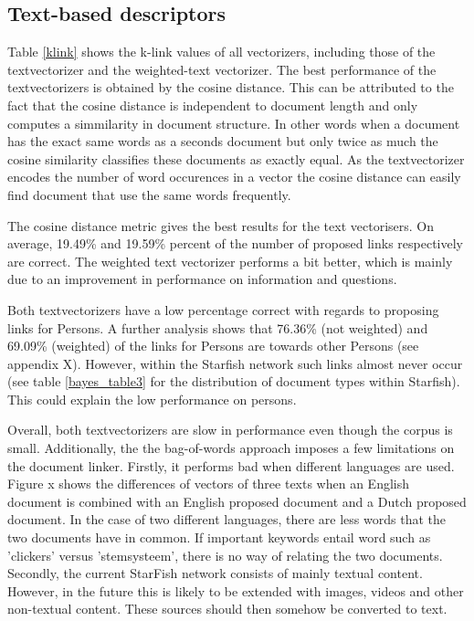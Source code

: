 \subsection{Text-based descriptors}
Table \ref{klink} shows the k-link values of all vectorizers, including those
of the textvectorizer and the weighted-text vectorizer. The best performance of
the textvectorizers is obtained by the cosine distance. This can be attributed
to the fact that the cosine distance is independent to document length and only
computes a simmilarity in document structure. In other words when a document
has the exact same words as a seconds document but only twice as much the
cosine similarity classifies these documents as exactly equal. As the textvectorizer
encodes the number of word occurences in a vector the cosine distance can 
easily find document that use the same words frequently.

The cosine distance metric gives the best results for the text vectorisers. On
average, 19.49\% and 19.59\% percent of the number of proposed links
respectively are correct. The weighted text vectorizer performs a bit better,
which is mainly due to an improvement in performance on information and
questions. %

Both textvectorizers have a low percentage correct with regards to proposing
links for Persons. A further analysis shows that 76.36\% (not weighted) and
69.09\% (weighted) of the links for Persons are towards other Persons (see
appendix X). However, within the Starfish network such links almost never occur
(see table \ref{bayes_table3} for the distribution of document types within
Starfish). This could explain the low performance on persons. 

Overall, both textvectorizers are slow in performance even though the corpus is
small. Additionally, the the bag-of-words approach imposes a few limitations on
the document linker. Firstly, it performs bad when different languages are
used. Figure x shows the differences of vectors of three texts when an English
document is combined with an English proposed document and a Dutch proposed
document. In the case of two different languages, there are less words that the
two documents have in common. If important keywords entail word such as
'clickers' versus 'stemsysteem', there is no way of relating the two documents.
Secondly, the current StarFish network consists of mainly textual content.
However, in the future this is likely to be extended with images, videos and
other non-textual content. These sources should then somehow be converted to
text.

